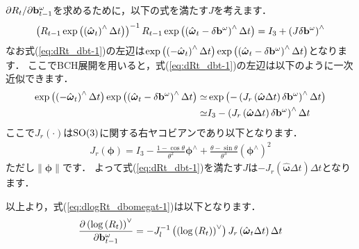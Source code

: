 $\partial R_{t} / \partial {\bf b}_{t-1}^{\omega}$を求めるために，以下の式を満たす$J$を考えます．
%
\begin{align}
  \left( R_{t-1} \exp \left( \left( \hat{ \boldsymbol \omega }_{t} \right)^{\wedge} \Delta t \right) \right)^{-1} R_{t-1} \exp \left( \left( \hat{ \boldsymbol \omega }_{t} - \delta {\bf b}^{\omega} \right)^{\wedge} \Delta t \right)
  = 
  I_{3} + \left( J \delta {\bf b}^{\omega} \right)^{\wedge}
  \label{eq:dRt_dbt-1}
\end{align}
%
なお式(\ref{eq:dRt_dbt-1})の左辺は$\exp \left( \left( - \hat{ \boldsymbol \omega }_{t} \right)^{\wedge} \Delta t \right) \exp \left( \left( \hat{ \boldsymbol \omega }_{t} - \delta {\bf b}^{\omega} \right)^{\wedge} \Delta t \right)$となります．
ここでBCH展開を用いると，式(\ref{eq:dRt_dbt-1})の左辺は以下のように一次近似できます．
%
\begin{align}
  \begin{split}
    \exp \left( \left( - \hat{ \boldsymbol \omega }_{t} \right)^{\wedge} \Delta t \right) \exp \left( \left( \hat{ \boldsymbol \omega }_{t} - \delta {\bf b}^{\omega} \right)^{\wedge} \Delta t \right)
%
    \simeq &
%
    \exp \left( - \left( J_{r} \left( \hat{ \boldsymbol \omega } \Delta t \right) \delta {\bf b}^{\omega} \right)^{\wedge} \Delta t \right) \\
%
    \simeq & 
%
    I_{3} - \left( J_{r} \left( \hat{ \boldsymbol \omega } \Delta t \right) \delta {\bf b}^{\omega} \right)^{\wedge} \Delta t
  \end{split}
\end{align}
%
ここで$J_{r} \left( \cdot \right)$は${\rm SO}(3)$に関する右ヤコビアンであり以下となります．
%
\begin{align}
  J_{r} \left( \boldsymbol \phi \right)
  =
  I_{3} -
  \frac{ 1 - \cos \theta }{ \theta^{2} } \boldsymbol \phi^{\wedge} +
  \frac{ \theta - \sin \theta }{ \theta^{3} } \left( \boldsymbol \phi^{\wedge} \right)^{2}
\end{align}
%
ただし$\| \boldsymbol \phi \|$です．
よって式(\ref{eq:dRt_dbt-1})を満たす$J$は$- J_{r} \left( \hat{ \boldsymbol \omega } \Delta t \right) \Delta t$となります．

以上より，式(\ref{eq:dlogRt_dbomegat-1})は以下となります．
%
\begin{align}
  \frac{ \partial \left( \log \left( R_{t} \right) \right)^{\vee} }{ \partial {\bf b}_{t-1}^{\omega} }
  =
  - J_{l}^{-1} \left( \left( \log \left( R_{t} \right) \right)^{\vee} \right)
  J_{r} \left( \hat{ \boldsymbol \omega }_{t} \Delta t \right) \Delta t
\end{align}

